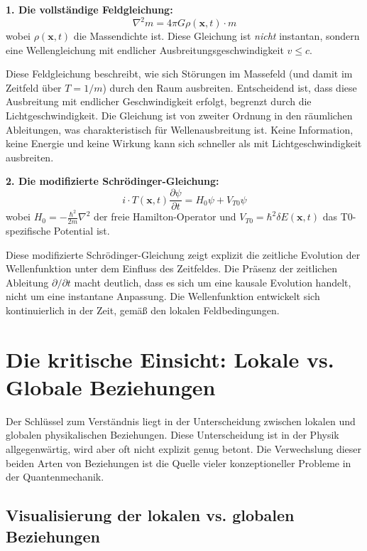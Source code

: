 	\textbf{1. Die vollständige Feldgleichung:}
	\begin{equation}
		\nabla^2 m = 4\pi G \rho(\mathbf{x},t) \cdot m \label{eq:field_equation}
	\end{equation}
	wobei $\rho(\mathbf{x},t)$ die Massendichte ist. Diese Gleichung ist \emph{nicht} instantan, sondern eine Wellengleichung mit endlicher Ausbreitungsgeschwindigkeit $v \leq c$.
	
	Diese Feldgleichung beschreibt, wie sich Störungen im Massefeld (und damit im Zeitfeld über $T = 1/m$) durch den Raum ausbreiten. Entscheidend ist, dass diese Ausbreitung mit endlicher Geschwindigkeit erfolgt, begrenzt durch die Lichtgeschwindigkeit. Die Gleichung ist von zweiter Ordnung in den räumlichen Ableitungen, was charakteristisch für Wellenausbreitung ist. Keine Information, keine Energie und keine Wirkung kann sich schneller als mit Lichtgeschwindigkeit ausbreiten.
	
	\textbf{2. Die modifizierte Schrödinger-Gleichung:}
	\begin{equation}
		i \cdot T(\mathbf{x},t) \frac{\partial \psi}{\partial t} = H_0 \psi + V_{T0} \psi \label{eq:schroedinger}
	\end{equation}
	wobei $H_0 = -\frac{\hbar^2}{2m}\nabla^2$ der freie Hamilton-Operator und $V_{T0} = \hbar^2 \delta E(\mathbf{x},t)$ das T0-spezifische Potential ist.
	
	Diese modifizierte Schrödinger-Gleichung zeigt explizit die zeitliche Evolution der Wellenfunktion unter dem Einfluss des Zeitfeldes. Die Präsenz der zeitlichen Ableitung $\partial/\partial t$ macht deutlich, dass es sich um eine kausale Evolution handelt, nicht um eine instantane Anpassung. Die Wellenfunktion entwickelt sich kontinuierlich in der Zeit, gemäß den lokalen Feldbedingungen.
	
	\section{Die kritische Einsicht: Lokale vs. Globale Beziehungen}
	
	Der Schlüssel zum Verständnis liegt in der Unterscheidung zwischen lokalen und globalen physikalischen Beziehungen. Diese Unterscheidung ist in der Physik allgegenwärtig, wird aber oft nicht explizit genug betont. Die Verwechslung dieser beiden Arten von Beziehungen ist die Quelle vieler konzeptioneller Probleme in der Quantenmechanik.
	\subsection{Visualisierung der lokalen vs. globalen Beziehungen}
	
